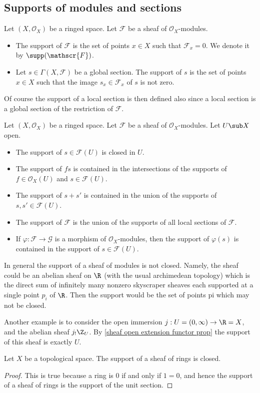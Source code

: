 \subsection{Supports of modules and sections}
\begin{definition}
Let $(X,\mathscr{O}_X)$ be a ringed space. Let $\mathscr{F}$ be a sheaf of $\mathscr{O}_X$-modules.
\begin{itemize}
\item The support of $\mathscr{F}$ is the set of points $x\in X$ such that $\mathscr{F}_x=0$. We denote it by $\supp(\mathscr{F})$.
\item Let $s\in\Gamma(X,\mathscr{F})$ be a global section. The support of $s$ is the set of points $x\in X$ such that the image $s_x\in\mathscr{F}_x$ of $s$ is not zero.
\end{itemize}
\end{definition}
Of course the support of a local section is then defined also since a local section is a global section of the restriction of $\mathscr{F}$.
\begin{lemma}
Let $(X,\mathscr{O}_X)$ be a ringed space. Let $\mathscr{F}$ be a sheaf of $\mathscr{O}_X$-modules. Let $U\sub X$ open.
\begin{itemize}
\item The support of $s\in\mathscr{F}(U)$ is closed in $U$.
\item The support of $fs$ is contained in the intersections of the supports of $f\in\mathscr{O}_X(U)$ and $s\in\mathscr{F}(U)$.
\item The support of $s+s'$ is contained in the union of the supports of $s,s'\in\mathscr{F}(U)$.
\item The support of $\mathscr{F}$ is the union of the supports of all local sections of $\mathscr{F}$.
\item If $\varphi:\mathscr{F}\to\mathscr{G}$ is a morphism of $\mathscr{O}_X$-modules, then the support of $\varphi(s)$ is contained in the support of $s\in\mathscr{F}(U)$. 
\end{itemize}
\end{lemma}
In general the support of a sheaf of modules is not closed. Namely, the sheaf could be an abelian sheaf on $\R$ (with the usual archimedean topology) which is the direct sum of infinitely many nonzero skyscraper sheaves each supported at a single point $p_i$ of $\R$. Then the support would be the set of points pi which may not be closed.\par
Another example is to consider the open immersion $j:U=(0,\infty)\to\R=X$,
and the abelian sheaf $j_!\Z_U$. By \cref{sheaf open extension functor prop} the support of this sheaf is exactly $U$.
\begin{lemma}\label{sheaf ring supp closed}
Let $X$ be a topological space. The support of a sheaf of rings is closed.
\end{lemma}
\begin{proof}
This is true because a ring is $0$ if and only if $1=0$, and hence the support of a sheaf of rings is the support of the unit section.
\end{proof}
